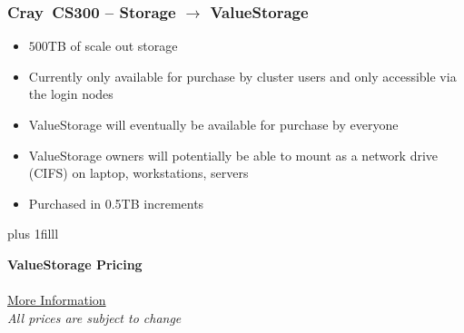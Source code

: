 \documentclass[t,hyperref={pdfpagelabels=false}]{beamer}
\newcommand{\btVFill}{\vskip0pt plus 1filll}
\newcommand{\craycs}{Cray~CS300}
\begin{document}
\begin{frame}
	\frametitle{{\craycs} -- Storage $\rightarrow$ ValueStorage}
	\begin{itemize}
		\item $500$TB of scale out storage
		\item Currently only available for purchase by cluster users and only accessible via the login nodes
		\item ValueStorage will eventually be available for purchase by everyone
		\item ValueStorage owners will potentially be able to mount as a network drive (CIFS) on laptop, workstations, servers
		\item Purchased in 0.5TB increments
	\end{itemize}
	\btVFill

	\begin{center}
	\textbf{ValueStorage Pricing}~\\ 
		~\\ \href{http://www.hawaii.edu/its/value-storage-pricing/}{More Information}
		~\\	{\footnotesize \emph{All prices are subject to change}}
	\end{center}
\end{frame}
\end{document}
